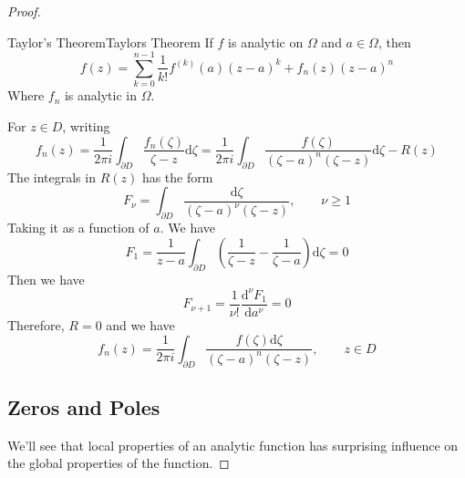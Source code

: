 \documentclass[../main.tex]{subfiles}
\begin{document}
\begin{proof}
\begin{theorem}{Taylor's Theorem}{Taylors Theorem}
	If $f$ is analytic on $\Omega$ and $a\in \Omega$, then
	\begin{equation*}
	f(z) = \sum_{k=0}^{n-1} \frac{1}{k!}f^{(k)}(a) (z-a)^k + f_n(z)(z-a)^n
	\end{equation*}
	Where $f_n$ is analytic in $\Omega$.
\end{theorem}
For $z\in D$, writing
\begin{equation*}
f_n(z) = \frac{1}{2 \pi i}\int_{\partial D} \frac{f_n(\zeta)}{\zeta-z}\mathrm{d} \zeta = \frac{1}{2 \pi i}\int_{\partial D} \frac{f(\zeta)}{(\zeta-a)^n(\zeta-z)} \mathrm{d} \zeta - R(z)
\end{equation*}
The integrals in $R(z)$ has the form
\begin{equation*}
F_{\nu} = \int_{\partial D} \frac{\mathrm{d} \zeta}{(\zeta-a)^{\nu}(\zeta-z)}, \qquad \nu \geq 1
\end{equation*}
Taking it as a function of $a$. We have
\begin{equation*}
F_1 = \frac{1}{z-a}\int_{\partial D} \left(\frac{1}{\zeta-z}-\frac{1}{\zeta-a}\right)\mathrm{d} \zeta = 0
\end{equation*}
Then we have
\begin{equation*}
F_{\nu+1} = \frac{1}{\nu!} \frac{\mathrm{d}^{\nu}F_1}{\mathrm{d} a^{\nu}} = 0
\end{equation*}
Therefore, $R=0$ and we have
\begin{equation}\label{eq:Evaluation of fn}
f_n(z) = \frac{1}{2 \pi i}\int_{\partial D} \frac{f(\zeta) \mathrm{d} \zeta}{(\zeta-a)^{n}(\zeta-z)}, \qquad z\in D
\end{equation}

\subsection{Zeros and Poles}
We'll see that local properties of an analytic function has surprising influence on the global properties of the function.


\end{proof}
\end{document}
